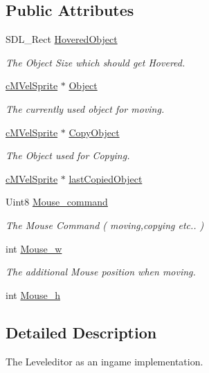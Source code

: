 \subsection*{Public Attributes}
\begin{DoxyCompactItemize}
\item 
S\-D\-L\-\_\-\-Rect \hyperlink{classc_level_editor_af8cfd884c7e53979b9779adfeb565db0}{Hovered\-Object}
\begin{DoxyCompactList}\small\item\em The Object Size which should get Hovered. \end{DoxyCompactList}\item 
\hyperlink{classc_m_vel_sprite}{c\-M\-Vel\-Sprite} $\ast$ \hyperlink{classc_level_editor_a9a98c763805e3bb1a8bcc22ba4d82402}{Object}
\begin{DoxyCompactList}\small\item\em The currently used object for moving. \end{DoxyCompactList}\item 
\hyperlink{classc_m_vel_sprite}{c\-M\-Vel\-Sprite} $\ast$ \hyperlink{classc_level_editor_a5755a1e20a4f0d867a3f00099776f463}{Copy\-Object}
\begin{DoxyCompactList}\small\item\em The Object used for Copying. \end{DoxyCompactList}\item 
\hyperlink{classc_m_vel_sprite}{c\-M\-Vel\-Sprite} $\ast$ \hyperlink{classc_level_editor_afc34d3213256e56166d2e63f6f99c7c5}{last\-Copied\-Object}
\item 
Uint8 \hyperlink{classc_level_editor_ad8c34053eaa9c6d35524c97ca5161fb2}{Mouse\-\_\-command}
\begin{DoxyCompactList}\small\item\em The Mouse Command ( moving,copying etc.. ) \end{DoxyCompactList}\item 
int \hyperlink{classc_level_editor_a32f6f1d993d0f232b1a4ad3a677d8d04}{Mouse\-\_\-w}
\begin{DoxyCompactList}\small\item\em The additional Mouse position when moving. \end{DoxyCompactList}\item 
int \hyperlink{classc_level_editor_a7efa035ab3b247bf78b2b60dead823d5}{Mouse\-\_\-h}
\end{DoxyCompactItemize}


\subsection{Detailed Description}
The Leveleditor as an ingame implementation. 

